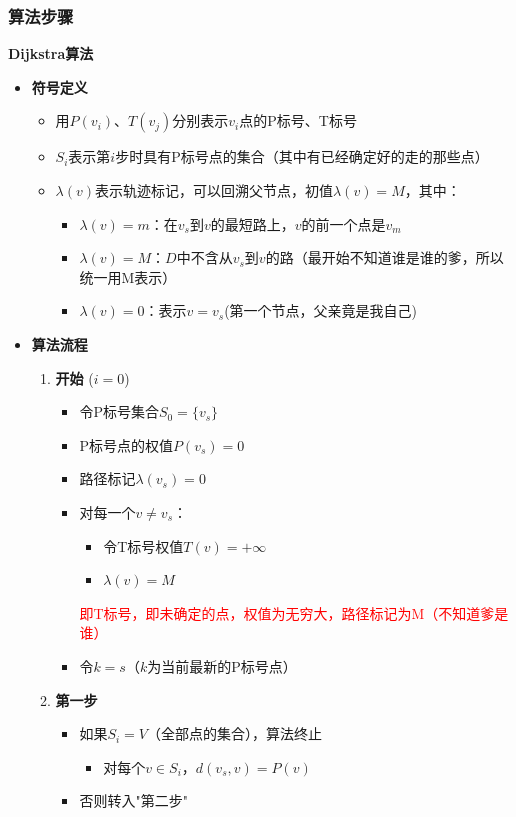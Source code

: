 	\subsubsection{算法步骤}
	\begin{thmbox}{\textbf{Dijkstra算法}}{}
		\begin{itemize}
		\item {\textbf{符号定义}}
		\begin{itemize}
			\item 用$P(v_i)$、$T(v_j)$分别表示$v_i$点的P标号、T标号
			\item $S_i$表示第$i$步时具有P标号点的集合（其中有已经确定好的走的那些点）
			\item $\lambda(v)$表示轨迹标记，可以回溯父节点，初值$\lambda(v)=M$，其中：
			\begin{itemize}
				\item $\lambda(v)=m$：在$v_s$到$v$的最短路上，$v$的前一个点是$v_m$
				\item $\lambda(v)=M$：$D$中不含从$v_s$到$v$的路（最开始不知道谁是谁的爹，所以统一用M表示）
				\item $\lambda(v)=0$：表示$v=v_s$(第一个节点，父亲竟是我自己)
			\end{itemize}

		\end{itemize}
		
		\item {\textbf{算法流程}}
		\begin{enumerate}[label=\textbf{步骤 \arabic*：}, leftmargin=*]
			\item \textbf{开始} ($i=0$)
			\begin{itemize}
				\item 令P标号集合$S_0 = \{v_s\}$
				\item P标号点的权值$P(v_s) = 0$
				\item 路径标记$\lambda(v_s) = 0$
				\item 对每一个$v \neq v_s$：
				\begin{itemize}
					\item 令T标号权值$T(v) = +\infty$
					\item $\lambda(v) = M$
				\end{itemize}
				\textcolor{red}{即T标号，即未确定的点，权值为无穷大，路径标记为M（不知道爹是谁）}
				\item 令$k = s$（$k$为当前最新的P标号点）
			\end{itemize}
			
			\item \textbf{第一步}
			\begin{itemize}
				\item 如果$S_i = V$（全部点的集合），算法终止
				\begin{itemize}
					\item 对每个$v \in S_i$，$d(v_s,v) = P(v)$
				\end{itemize}
				\item 否则转入"第二步"
			\end{itemize}
			

\end{enumerate}
\end{itemize}
\end{thmbox}
